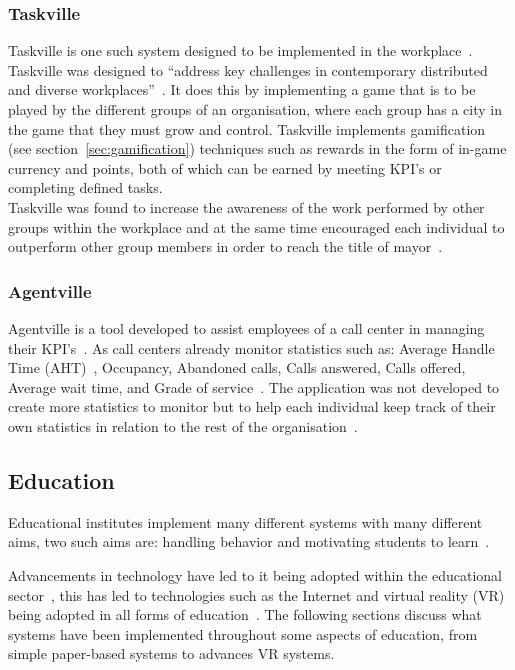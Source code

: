 \documentclass[a4paper,12pt]{article}
\begin{document}
\subsubsection{Taskville}\label{sec:taskville}
Taskville is one such system designed to be implemented in the workplace~\citep{taskville}. Taskville was designed to ``address key challenges in contemporary distributed and diverse workplaces''~\citep[p.~4]{taskville}. 
It does this by implementing a game that is to be played by the different groups of an organisation, where each group  has a city in the game that they must grow and control. Taskville implements gamification (see section~\ref{sec:gamification}) techniques such as rewards in the form of in-game currency and points, both of which can be earned by meeting KPI's or completing defined tasks.\\ Taskville was found to increase the awareness of the work performed by other groups within the workplace and at the same time encouraged each individual to outperform other group members in order to reach the title of mayor~\citep{taskville}.

\subsubsection{Agentville}\label{sec:agentville}
Agentville is a tool developed to assist employees of a call center in managing their KPI's~\citep{production-environments}. As call centers already monitor statistics such as: Average Handle Time (AHT)~\citep{production-environments},	Occupancy, Abandoned calls,	Calls answered,	Calls offered, Average wait time, and Grade of service~\citep{call-center}. The application was not developed to create more statistics to monitor but to help each individual keep track of their own statistics in relation to the rest of the organisation~\citep{production-environments}.

\subsection{Education}\label{sec:education}
Educational institutes implement many different systems with many different aims, two such aims are: handling behavior and motivating students to learn~\citep{deci_extrinsic_2001}.

\par
Advancements in technology have led to it being adopted within the educational sector~\citep{distance-education}, this has led to technologies such as the Internet and virtual reality (VR) being adopted in all forms of education~\citep{virtual-reality}.
The following sections discuss what systems have been implemented throughout some aspects of education, from simple paper-based systems to advances VR systems.
\end{document}
